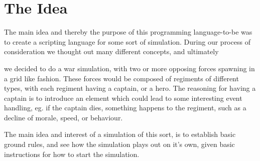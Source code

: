 \section{The Idea}

	The main idea and thereby the purpose of this programming language-to-be 
	was to create a scripting language for some sort of simulation. 
	During our process of consideration we thought out many different concepts, 
	and ultimately 
	\begin{comment}we came to a decision that it would be more interesting to 
	have a controlled environment with a lot of units participating. Reasons for 
	this is that the simulation would not be very interesting to perform when dealing with minor numbers, 
	the reasoning behind this is that we do not expect to make a very complicated simulation, therefore dealing in larger numbers proved 
	more interesting to us. \newline
	
	Ultimately\end{comment}
	we decided to do a war simulation, with two or more opposing forces 
	spawning in a grid like fashion. These forces would be composed of regiments of 
	different types, with each regiment having a captain, or a hero. The reasoning for having a 
	captain is to introduce an element which could lead to some interesting event handling, 
	eg. if the captain dies, something happens to the regiment, such as a decline of morale, speed, or behaviour. \newline
	
	The main idea and interest of a simulation of this sort, is to establish basic ground rules, 
	and see how the simulation plays out on it's own, given basic instructions for how to start the simulation.